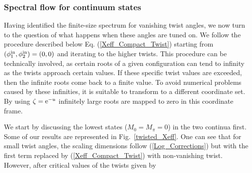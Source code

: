 \documentclass[12pt]{article}
\numberwithin{equation}{section}
\newcommand{\re}{{\rm e}}
\begin{document}
\subsubsection{Spectral flow for continuum states}

Having identified the finite-size spectrum for vanishing twist angles, we now turn to the question of what happens when these angles are tuned on. We follow the procedure described below Eq.  (\ref{Xeff_Compact_Twist}) starting from $(\phi^{ \rm{in}}_1,\phi^{ \rm{in}}_{2})=(0,0)$ and iterating to the higher twists. This procedure can be technically involved, as certain roots of a given configuration can tend to infinity as the twists approach certain values. If these specific twist values are exceeded, then the infinite roots come back to a finite value. To avoid numerical problems caused by these infinities, it is suitable to transform to a different coordinate set. By using $\zeta=\re^{-u}$ infinitely large roots are mapped to zero in this coordinate frame. 

We start by discussing the lowest states ($M_0=M_\pi=0$) in the two continua first. 
Some of our results are represented in Fig.~\ref{twisted_Xeff}. One can see that for small twist angles, the scaling dimensions follow  (\ref{Log_Corrections}) but with the first term replaced by (\ref{Xeff_Compact_Twist}) with non-vanishing twist. However, after critical values of the twists given by 
\end{document}
